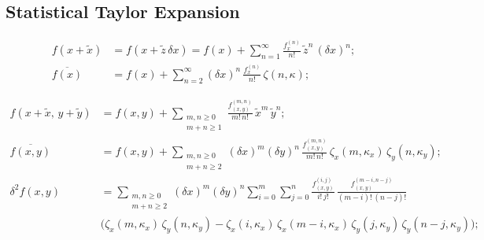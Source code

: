 \documentclass[twoside]{article}
\numberwithin{equation}{section}
\begin{document}
\subsection{Statistical Taylor Expansion}

\begin{align}
\label{eqn: Taylor 1d}
f(x + \tilde{x}) &= f(x + \tilde{z}\, \delta x) = f(x) + \sum_{n=1}^{\infty} \frac{f^{(n)}_x}{n!}\, \tilde{z}^n\, (\delta x)^n; \\
\label{eqn: Taylor 1d mean}
\overline{f(x)} &= f(x) + \sum_{n=2}^{\infty} (\delta x)^n\, \frac{f^{(n)}_x}{n!}\, \zeta(n, \kappa);
\end{align}

\begin{align}
\label{eqn: Taylor 2d}
f(x + \tilde{x},\, y + \tilde{y}) &= f(x, y) + \sum_{\substack{m, n \geq 0 \\ m + n \geq 1}} \frac{f^{(m,n)}_{(x,y)}}{m!\, n!}\, \tilde{x}^m\, \tilde{y}^n; \\
\label{eqn: Taylor 2d mean}
\overline{f(x, y)} &= f(x, y) + \sum_{\substack{m, n \geq 0 \\ m + n \geq 2}} (\delta x)^m (\delta y)^n\, \frac{f^{(m,n)}_{(x,y)}}{m!\, n!}\, \zeta_x(m, \kappa_x)\, \zeta_y(n, \kappa_y); \\
\label{eqn: Taylor 2d variance}
\delta^2 f(x, y) &= \sum_{\substack{m, n \geq 0 \\ m + n \geq 2}} (\delta x)^m (\delta y)^n \sum_{i=0}^{m} \sum_{j=0}^{n}
		\frac{f^{(i,j)}_{(x,y)}}{i!\, j!}\, \frac{f^{(m-i, n-j)}_{(x,y)}}{(m-i)!\, (n-j)!} \nonumber \\
	&\bigl( \zeta_x(m, \kappa_x)\, \zeta_y(n, \kappa_y) - \zeta_x(i, \kappa_x)\, \zeta_x(m-i, \kappa_x)\, \zeta_y(j, \kappa_y)\, \zeta_y(n-j, \kappa_y) \bigr);
\end{align}
\end{document}

